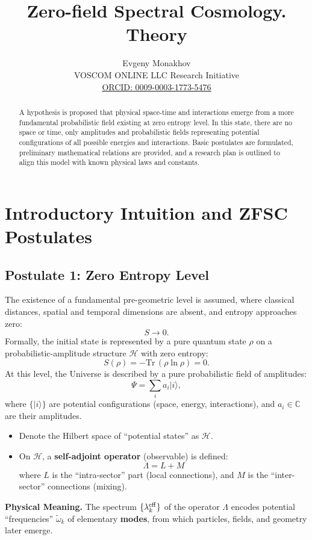 \documentclass[12pt,a4paper]{article}
\title{Zero-field Spectral Cosmology. Theory}
\author{Evgeny Monakhov \\ VOSCOM ONLINE LLC Research Initiative \\ \href{https://orcid.org/0009-0003-1773-5476}{ORCID: 0009-0003-1773-5476}}
\date{}
\begin{document}
\maketitle

\begin{abstract}
A hypothesis is proposed that physical space-time and interactions emerge from a more fundamental probabilistic field existing at zero entropy level. In this state, there are no space or time, only amplitudes and probabilistic fields representing potential configurations of all possible energies and interactions. Basic postulates are formulated, preliminary mathematical relations are provided, and a research plan is outlined to align this model with known physical laws and constants.
\end{abstract}

\section{Introductory Intuition and ZFSC Postulates}

\subsection{Postulate 1: Zero Entropy Level}
The existence of a fundamental pre-geometric level is assumed, where classical distances, spatial and temporal dimensions are absent, and entropy approaches zero:
\[
S \to 0.
\]
Formally, the initial state is represented by a pure quantum state \(\rho\) on a probabilistic-amplitude structure \(\mathcal H\) with zero entropy:
\[
S(\rho) = -\mathrm{Tr}\,(\rho \ln \rho) = 0.
\]
At this level, the Universe is described by a pure probabilistic field of amplitudes:
\[
\Psi = \sum_{i} a_i |i\rangle ,
\]
where \(\{|i\rangle\}\) are potential configurations (space, energy, interactions), and \(a_i \in \mathbb{C}\) are their amplitudes.

\begin{itemize}
    \item Denote the Hilbert space of ``potential states'' as \(\mathcal{H}\).
    \item On \(\mathcal{H}\), a \textbf{self-adjoint operator} (observable) is defined:
    \[
    \boxed{\Lambda = L + M} \tag{1}
    \]
    where \(L\) is the ``intra-sector'' part (local connections), and \(M\) is the ``inter-sector'' connections (mixing).
\end{itemize}

\textbf{Physical Meaning.} The spectrum \(\{\lambda_k^{\rm eff}\}\) of the operator \(\Lambda\) encodes potential ``frequencies'' \(\tilde{\omega}_k\) of elementary \textbf{modes}, from which particles, fields, and geometry later emerge.
\end{document}
